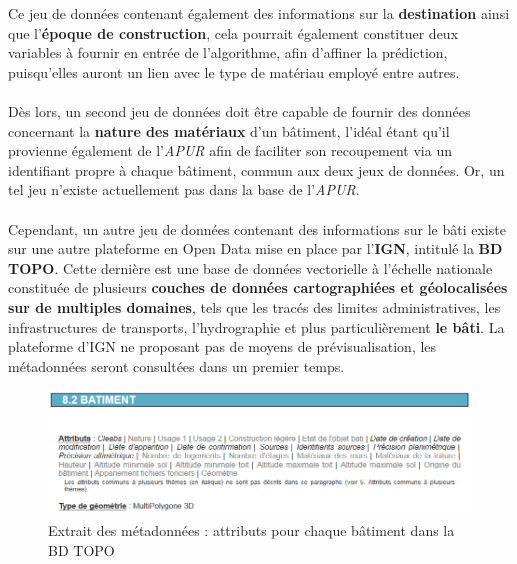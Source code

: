 \documentclass[
  11pt,
  french,
]{article}
\begin{document}
Ce jeu de données contenant également des informations sur la
\textbf{destination} ainsi que l'\textbf{époque de construction}, cela
pourrait également constituer deux variables à fournir en entrée de
l'algorithme, afin d'affiner la prédiction, puisqu'elles auront un lien
avec le type de matériau employé entre autres.\\
~\\
Dès lors, un second jeu de données doit être capable de fournir des
données concernant la \textbf{nature des matériaux} d'un bâtiment,
l'idéal étant qu'il provienne également de l'\emph{APUR} afin de
faciliter son recoupement via un identifiant propre à chaque bâtiment,
commun aux deux jeux de données. Or, un tel jeu n'existe actuellement
pas dans la base de l'\emph{APUR}.\\
~\\
Cependant, un autre jeu de données contenant des informations sur le
bâti existe sur une autre plateforme en Open Data mise en place par
l'\textbf{IGN}, intitulé la \textbf{BD TOPO}. Cette dernière est une
base de données vectorielle à l'échelle nationale constituée de
plusieurs \textbf{couches de données cartographiées et géolocalisées sur
de multiples domaines}, tels que les tracés des limites administratives,
les infrastructures de transports, l'hydrographie et plus
particulièrement \textbf{le bâti}. La plateforme d'IGN ne proposant pas
de moyens de prévisualisation, les métadonnées seront consultées dans un
premier temps.

\begin{tcolorbox}
\begin{figure}

{\centering \includegraphics[width=0.9\linewidth]{__imgs/meta_ign} 

}

\caption[Extrait des métadonnées : attributs pour chaque bâtiment dans la BD TOPO  -  \url{https://qlf-geoservices.ign.fr/ressources_documentaires/Espace_documentaire/BASES_VECTORIELLES/BDTOPO/DC_BDTOPO_3-0.pdf}]{Extrait des métadonnées : attributs pour chaque bâtiment dans la BD TOPO}\label{fig:meta_ign}
\end{figure}
\end{tcolorbox}
\end{document}
